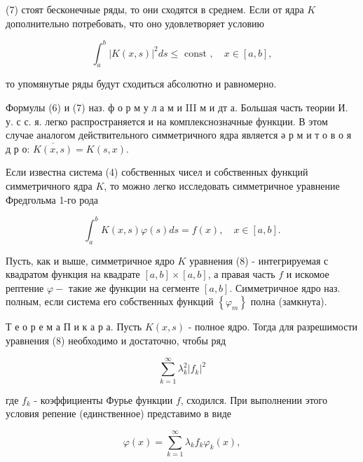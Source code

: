 \documentclass[10pt]{article}
\begin{document}
(7) стоят бесконечные ряды, то они сходятся в среднем. Если от ядра $K$ дополнительно потребовать, что оно удовлетворяет условию



\[

\int_{a}^{b}|K(x, s)|^{2} d s \leqslant \text { const }, \quad x \in[a, b],

\]



то упомянутые ряды будут сходиться абсолютно и равномерно.



Формулы (6) и (7) наз. ф о р м у л а м и III м и дт а. Большая часть теории И. у. с с. я. легко распространяется и на комплекснозначные функции. В этом случае аналогом действительного симметричного ядра является ә р м и т о в о я д р о: $\overline{K(x, s)}=K(s, x)$.



Если известна система (4) собственных чисел и собственных функций симметричного ядра $K$, то можно легко исследовать симметричное уравнение Фредгольма 1-го рода



\[

\int_{a}^{b} K(x, s) \varphi(s) d s=f(x), \quad x \in[a, b] .

\]



Пусть, как и выше, симметричное ядро $K$ уравнения (8) - интегрируемая с квадратом функция на квадрате $[a, b] \times[a, b]$, а правая часть $f$ и искомое рептение $\varphi-$ такие же функции на сегменте $[a, b]$. Симметричное ядро наз. полным, если система его собственных функций $\left\{\varphi_{m}\right\}$ полна (замкнута).



Т е о р е м а П и к а р а. Пусть $K(x, s)$ - полное ядро. Тогда для разрешимости уравнения (8) необходимо и достаточно, чтобы ряд



\[

\sum_{k=1}^{\infty} \lambda_{k}^{2}\left|f_{k}\right|^{2}

\]



где $f_{k}$ - коэффициенты Фурье функции $f$, сходился. При выполнении этого условия репение (единственное) представимо в виде



\[

\varphi(x)=\sum_{k=1}^{\infty} \lambda_{k} f_{k} \varphi_{k}(x),

\]
\end{document}
